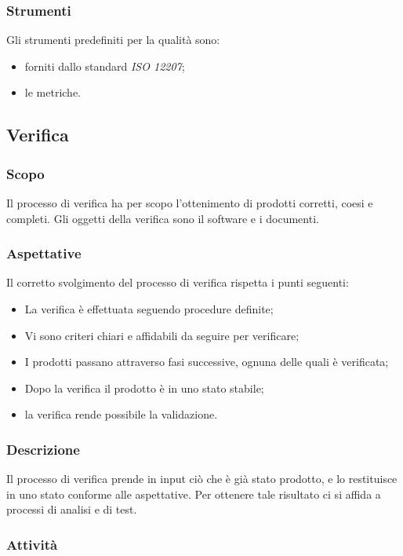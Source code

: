 	\subsubsection{Strumenti}
	Gli strumenti predefiniti per la qualità sono: 
	\begin{itemize}
		\item forniti dallo standard \textit{ISO 12207};
		\item le metriche.
	\end{itemize} 
		
\subsection{Verifica}
	\subsubsection{Scopo}
	Il processo di verifica ha per scopo l'ottenimento di prodotti corretti, coesi e completi. Gli oggetti della verifica sono il software e i documenti. 
	\subsubsection{Aspettative}
	Il corretto svolgimento del processo di verifica rispetta i punti seguenti:	
	\begin{itemize}
		\item La verifica è effettuata seguendo procedure definite;
		\item Vi sono criteri chiari e affidabili da seguire per verificare;
		\item I prodotti passano attraverso fasi successive, ognuna delle quali è verificata;
		\item Dopo la verifica il prodotto è in uno stato stabile;
		\item la verifica rende possibile la validazione.
	\end{itemize}
	\subsubsection{Descrizione}
	Il processo di verifica prende in input ciò che è già stato prodotto, e lo restituisce in uno stato conforme alle aspettative. Per ottenere tale risultato ci si affida a processi di analisi e di test.
	\subsubsection{Attività}
